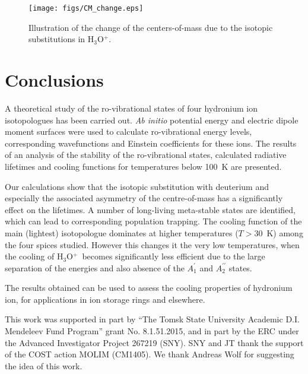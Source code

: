 \documentclass[prb,preprint,12pt,superscriptaddress,floatfix,bibnotes,nofootinbib,unsortedaddress,preprintnumbers,amsmath,amssymb]{revtex4}
\newcommand{\p}{^\prime}
\newcommand{\pp}{^{\prime\prime}}
\newcommand{\ohhh}{H$_3$O$^{+}$}
\newcommand{\2}{$_{2}$}
\newcommand{\3}{$_{3}$}
\begin{document}
\begin{figure}%

  \texttt{[image: figs/CM\_change.eps]}

  \caption{\label{fig:CM} Illustration of the change of the centers-of-mass due to the isotopic substitutions in \ohhh.}

\end{figure}



\section{Conclusions}


A theoretical study of the ro-vibrational states of four hydronium ion
isotopologues has been carried out. \textit{Ab initio} potential energy and
electric dipole moment surfaces were used to calculate ro-vibrational energy
levels, corresponding wavefunctions and Einstein coefficients for these ions.
The results of an analysis of the stability of the ro-vibrational states,
calculated radiative lifetimes and cooling functions for temperatures below
100~K are presented.

Our calculations show that the isotopic substitution with deuterium and
especially the associated asymmetry of the centre-of-mass has a significantly
effect on the lifetimes. A number of long-living meta-stable states are
identified, which can lead to corresponding population trapping. The cooling
function of the main (lightest) isotopologue dominates at higher temperatures
($T>30$~K) among the four spices studied. However this changes it the very low
temperatures, when the cooling of \ohhh\ becomes significantly less efficient
due to the large separation of the energies and also absence of the $A_1\p$ and
$A_2\pp$ states.

The results obtained can be used to assess the cooling properties of hydronium ion,
for applications in ion storage rings and elsewhere.



\begin{acknowledgments}

This work was supported in part by ``The Tomsk State University Academic D.I. Mendeleev Fund Program'' grant No. 8.1.51.2015, and in part by the ERC under the Advanced Investigator Project 267219 (SNY). SNY and JT thank the support of the COST action MOLIM (CM1405). We thank Andreas Wolf for suggesting the idea of this work.



\end{acknowledgments}



%



%

\end{document}
